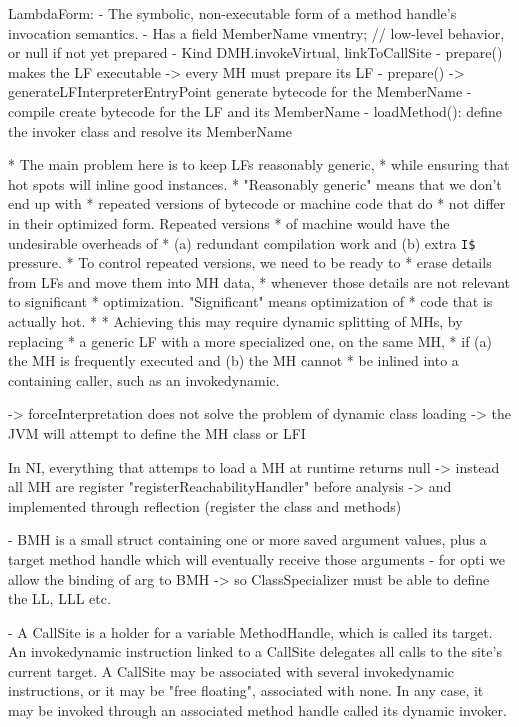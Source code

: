 LambdaForm: 
- The symbolic, non-executable form of a method handle's invocation semantics.
- Has a field MemberName vmentry;   // low-level behavior, or null if not yet prepared
- Kind DMH.invokeVirtual, linkToCallSite
- prepare() makes the LF executable -> every MH must prepare its LF
- prepare() -> generateLFInterpreterEntryPoint generate bytecode for the MemberName
- compile create bytecode for the LF and its MemberName
- loadMethod(): define the invoker class and resolve its MemberName

     * The main problem here is to keep LFs reasonably generic,
     * while ensuring that hot spots will inline good instances.
     * "Reasonably generic" means that we don't end up with
     * repeated versions of bytecode or machine code that do
     * not differ in their optimized form.  Repeated versions
     * of machine would have the undesirable overheads of
     * (a) redundant compilation work and (b) extra \verb|I$| pressure.
     * To control repeated versions, we need to be ready to
     * erase details from LFs and move them into MH data,
     * whenever those details are not relevant to significant
     * optimization.  "Significant" means optimization of
     * code that is actually hot.
     *
     * Achieving this may require dynamic splitting of MHs, by replacing
     * a generic LF with a more specialized one, on the same MH,
     * if (a) the MH is frequently executed and (b) the MH cannot
     * be inlined into a containing caller, such as an invokedynamic.


-> forceInterpretation does not solve the problem of dynamic class loading -> the JVM will attempt to define the MH class or LFI

In NI, everything that attemps to load a MH at runtime returns null -> instead all MH are register "registerReachabilityHandler" before analysis
-> and implemented through reflection (register the class and methods)



- BMH is a small struct containing one or more saved argument values, plus a target method handle which will eventually receive those arguments
- for opti we allow the binding of arg to BMH -> so ClassSpecializer must be able to define the LL, LLL etc.

- A CallSite is a holder for a variable MethodHandle, which is called its target. An invokedynamic instruction linked to a CallSite delegates all calls to the site's current target. A CallSite may be associated with several invokedynamic instructions, or it may be "free floating", associated with none. In any case, it may be invoked through an associated method handle called its dynamic invoker. 